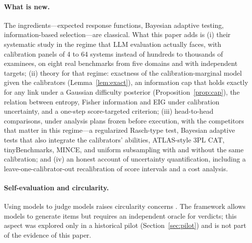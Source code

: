 \paragraph{What is new.} The ingredients---expected response functions, Bayesian
adaptive testing, information-based selection---are classical. What this paper adds is
(i) their systematic study in the regime that LLM evaluation actually faces, with
calibration panels of 4 to 64 systems instead of hundreds to thousands of examinees, on
eight real benchmarks from five domains and with independent targets;
(ii) theory for that regime: exactness of the calibration-marginal model given the
calibrators (Lemma~\ref{lem:exact}), an information cap that holds exactly for any link
under a Gaussian difficulty posterior (Proposition~\ref{prop:cap}), the relation between entropy, Fisher information and EIG
under calibration uncertainty, and a one-step score-targeted criterion; (iii) head-to-head
comparisons, under analysis plans frozen before execution, with the competitors that
matter in this regime---a regularized Rasch-type test, Bayesian adaptive tests that also
integrate the calibrators' abilities,
ATLAS-style 3PL CAT, tinyBenchmarks, MINCE, and uniform subsampling with and without the
same calibration; and (iv) an honest account of uncertainty quantification, including a
leave-one-calibrator-out recalibration of score intervals and a cost analysis.

\paragraph{Self-evaluation and circularity.} Using models to judge models raises
circularity concerns \citep{zheng2023judging}. The framework allows models to generate
items but requires an independent oracle for verdicts; this aspect was explored only in
a historical pilot (Section~\ref{sec:pilot}) and is not part of the evidence of this
paper.
